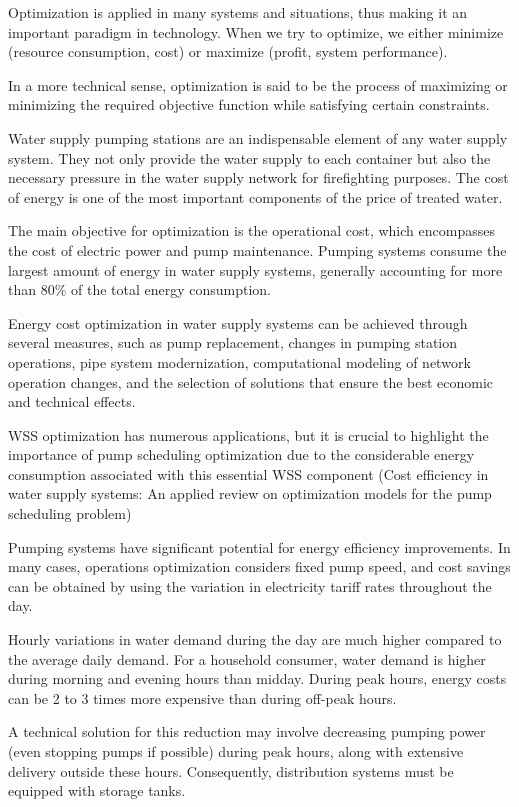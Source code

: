 Optimization is applied in many systems and situations, thus making it an important paradigm in technology. When we try to optimize, we either minimize (resource consumption, cost) or maximize (profit, system performance)\cite{rfc19}.

In a more technical sense, optimization is said to be the process of maximizing or minimizing the required objective function while satisfying certain constraints.\cite{rfc21}

Water supply pumping stations are an indispensable element of any water supply system. They not only provide the water supply to each container but also the necessary pressure in the water supply network for firefighting purposes. The cost of energy is one of the most important components of the price of treated water.\cite{rfc7}

The main objective for optimization is the operational cost, which encompasses the cost of electric power and pump maintenance.\cite{rfc2} Pumping systems consume the largest amount of energy in water supply systems, generally accounting for more than 80\% of the total energy consumption.\cite{rfc8}

Energy cost optimization in water supply systems can be achieved through several measures, such as pump replacement, changes in pumping station operations, pipe system modernization, computational modeling of network operation changes, and the selection of solutions that ensure the best economic and technical effects.\cite{rfc7}

WSS optimization has numerous applications, but it is crucial to highlight the importance of pump scheduling optimization due to the considerable energy consumption associated with this essential WSS component (Cost efficiency in water supply systems: An applied review on optimization models for the pump scheduling problem)

Pumping systems have significant potential for energy efficiency improvements. In many cases, operations optimization considers fixed pump speed, and cost savings can be obtained by using the variation in electricity tariff rates throughout the day.\cite{rfc8}

Hourly variations in water demand during the day are much higher compared to the average daily demand. For a household consumer, water demand is higher during morning and evening hours than midday. During peak hours, energy costs can be 2 to 3 times more expensive than during off-peak hours.

A technical solution for this reduction may involve decreasing pumping power (even stopping pumps if possible) during peak hours, along with extensive delivery outside these hours. Consequently, distribution systems must be equipped with storage tanks.


